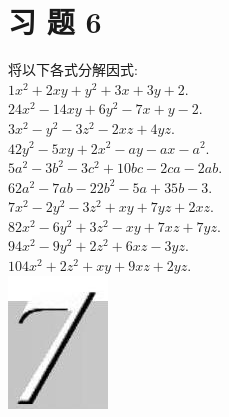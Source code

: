 \documentclass[10pt]{article}
\begin{document}
\section*{习 题 6}
将以下各式分解因式:\\
$1 x^{2}+2 x y+y^{2}+3 x+3 y+2$.\\
$24 x^{2}-14 x y+6 y^{2}-7 x+y-2$.\\
$3 x^{2}-y^{2}-3 z^{2}-2 x z+4 y z$.\\
$42 y^{2}-5 x y+2 x^{2}-a y-a x-a^{2}$.\\
$5 a^{2}-3 b^{2}-3 c^{2}+10 b c-2 c a-2 a b$.\\
$62 a^{2}-7 a b-22 b^{2}-5 a+35 b-3$.\\
$7 x^{2}-2 y^{2}-3 z^{2}+x y+7 y z+2 x z$.\\
$82 x^{2}-6 y^{2}+3 z^{2}-x y+7 x z+7 y z$.\\
$94 x^{2}-9 y^{2}+2 z^{2}+6 x z-3 y z$.\\
$104 x^{2}+2 z^{2}+x y+9 x z+2 y z$.\\
\includegraphics[max width=\textwidth, center]{2024_10_30_bd799899fef40368a068g-047(2)}
\end{document}

